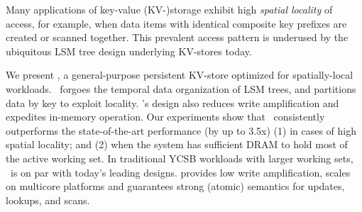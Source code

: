 Many applications of key-value (KV-)storage exhibit high \emph{spatial locality}
of access, for example, when data items with identical composite key prefixes are created or scanned together.  
This prevalent access pattern is underused by the ubiquitous LSM tree design underlying KV-stores today.

We present \sys, a general-purpose persistent KV-store optimized for spatially-local workloads. 
\sys\ forgoes the temporal data organization of LSM trees, and partitions data by key to exploit locality. 
%
\sys's design also reduces write amplification and expedites in-memory operation.
Our experiments show that \sys\ consistently outperforms the state-of-the-art performance 
(by up to 3.5x) (1) in cases of high spatial locality; and (2) when the system has sufficient DRAM 
to hold most of the active working set. 
In traditional YCSB workloads with larger working sets,%
\sys\ is on par with today's leading designs.
\sys\/ provides low write amplification, scales on multicore platforms and guarantees strong (atomic) semantics for updates, lookups, and scans. 
